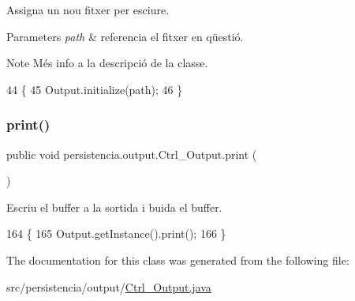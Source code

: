 Assigna un nou fitxer per esciure. 


\begin{DoxyParams}{Parameters}
{\em path} & referencia el fitxer en qüestió. \\
\hline
\end{DoxyParams}
\begin{DoxyNote}{Note}
Més info a la descripció de la classe. 
\end{DoxyNote}

\begin{DoxyCode}
44                                                \{
45         Output.initialize(path);
46     \}
\end{DoxyCode}
\mbox{\label{classpersistencia_1_1output_1_1Ctrl__Output_a908955c29bfecc7ebac86613bc75e9ed}} 
\subsubsection{\texorpdfstring{print()}{print()}}
{\footnotesize\ttfamily public void persistencia.\+output.\+Ctrl\+\_\+\+Output.\+print (\begin{DoxyParamCaption}{ }\end{DoxyParamCaption})\hspace{0.3cm}{\ttfamily [inline]}}



Escriu el buffer a la sortida i buida el buffer. 


\begin{DoxyCode}
164                         \{   
165         Output.getInstance().print();
166     \}
\end{DoxyCode}


The documentation for this class was generated from the following file\+:\begin{DoxyCompactItemize}
\item 
src/persistencia/output/\hyperlink{Ctrl__Output_8java}{Ctrl\+\_\+\+Output.\+java}\end{DoxyCompactItemize}
